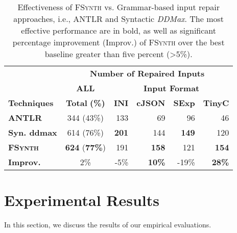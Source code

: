 \documentclass[sigconf,review,anonymous]{acmart}
\newcounter{todocounter}
\newcommand{\todo}[1]{\marginpar{$|$}\textcolor{red}{\stepcounter{todocounter}\footnote[\thetodocounter]{\textcolor{red}{\textbf{TODO }}\textit{#1}}}}
\renewcommand{\todo}[1]{}
\newcommand{\approach}{\textsc{FSynth}\xspace}
\newcommand{\ddmax}{\textit{DDMax}\xspace}
\begin{document}
\begin{table}[!tbp]\centering
\caption{Effectiveness of \approach vs. Grammar-based input repair approaches, i.e.,  ANTLR and Syntactic \ddmax. The most effective performance are in bold, as well as significant percentage improvement (Improv.) of \approach over the best baseline greater than five percent (>5\%). }
\begin{tabular}{|l | c | r  r  r  r |}
\hline
&  \multicolumn{5}{c|}{\textbf{Number of Repaired Inputs}}  \\
&  \multicolumn{1}{c|}{\textbf{ALL}} & \multicolumn{4}{c|}{\textbf{Input Format}}  \\
\textbf{Techniques} & \textbf{Total} \textbf{(\%)} & \textbf{INI} & \textbf{cJSON} & \textbf{SExp} & \textbf{TinyC} \\
\hline
\textbf{ANTLR} & 344 (43\%) & 133 & 69 & 96 &  46   \\
\textbf{Syn. ddmax} & 614 (76\%) & \textbf{201}  & 144  & \textbf{149}  & 120  \\ 	
\hline
\textbf{\approach}  & \textbf{624} (\textbf{77\%}) & 191 & \textbf{158}  & 121  &  \textbf{154} \\
\hline
\textbf{Improv.} &  2\%  & -5\% & \textbf{10\%} & -19\% & \textbf{28\%} \\
\hline
\end{tabular}
\label{tab:effectiveness-grammar}
\end{table}



\section{Experimental Results}
\label{sec:results}

In this section, we
discuss the %
results
of our empirical evaluations.

\end{document}
